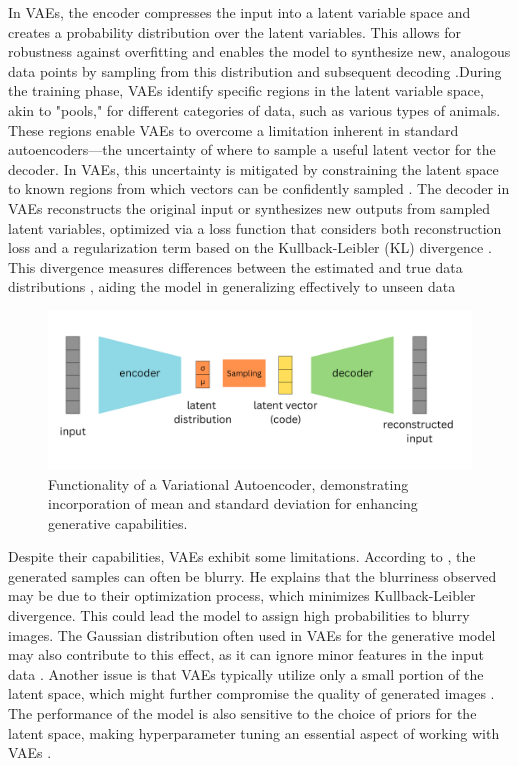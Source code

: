 In VAEs, the encoder compresses the input into a latent variable space and creates a probability distribution over the latent variables. This allows for robustness against overfitting and enables the model to synthesize new, analogous data points by sampling from this distribution and subsequent decoding \citep{kingmaVAE, rezendeVAE}.During the training phase, VAEs identify specific regions in the latent variable space, akin to "pools," for different categories of data, such as various types of animals. These regions enable VAEs to overcome a limitation inherent in standard autoencoders—the uncertainty of where to sample a useful latent vector for the decoder. In VAEs, this uncertainty is mitigated by constraining the latent space to known regions from which vectors can be confidently sampled \citep{doerschVAE}. The decoder in VAEs reconstructs the original input or synthesizes new outputs from sampled latent variables, optimized via a loss function that considers both reconstruction loss and a regularization term based on the Kullback-Leibler (KL) divergence \citep{GoodfellowDeepLearning}. This divergence measures differences between the estimated and true data distributions \citep{kingmaVAE}, aiding the model in generalizing effectively to unseen data


\begin{figure}[ht]
    \centering
      \hspace{.8cm}
      \includegraphics[width=.9\columnwidth]{figures/VAE.png}
      \caption{Functionality of a Variational Autoencoder, demonstrating incorporation of mean and standard deviation for enhancing generative capabilities.}
      \label{fig:figureVAE}
\end{figure}

Despite their capabilities, VAEs exhibit some limitations. According to \citeauthor{GoodfellowDeepLearning}, the generated samples can often be blurry. He explains that the blurriness observed may be due to their optimization process, which minimizes Kullback-Leibler divergence. This could lead the model to assign high probabilities to blurry images. The Gaussian distribution often used in VAEs for the generative model may also contribute to this effect, as it can ignore minor features in the input data \citep{GoodfellowDeepLearning}. Another issue is that VAEs typically utilize only a small portion of the latent space, which might further compromise the quality of generated images \citep{GoodfellowDeepLearning}. The performance of the model is also sensitive to the choice of priors for the latent space, making hyperparameter tuning an essential aspect of working with VAEs \citep{kingmaVAE, higginsVAE}. 